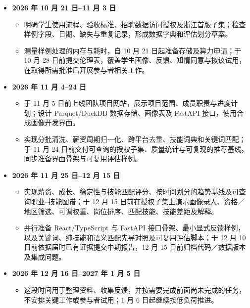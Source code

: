 \documentclass[a4paper,12pt]{article}
\begin{document}
\begin{itemize}
  \item \textbf{2026 年 10 月 21 日--11 月 3 日}
    \begin{itemize}
      \item 明确学生使用流程、验收标准、招聘数据访问授权及浙江首版子集；检查样例字段、日期、缺失与重复记录，形成数据字典和评估划分草案。
      \item 测量样例处理的内存与耗时，自 10 月 21 日起准备存储及算力申请；于 10 月 28 日前提交伦理表，覆盖学生画像、反馈、知情同意与拟议试用，在取得所需批准后开展参与者相关工作。
    \end{itemize}

  \item \textbf{2026 年 11 月 4--24 日}
    \begin{itemize}
      \item 于 11 月 5 日前上线团队项目网站，展示项目范围、成员职责与进度计划；设计 Parquet/DuckDB 数据存储、画像表及 FastAPI 接口，使用合成画像开发界面。
      \item 实现分批清洗、薪资周期归一化、跨平台去重、技能词典和关键词匹配；于 11 月 24 日前交付可查询的授权子集、质量统计与可复现的推荐基线。同步准备界面骨架与可复用评估样例。
    \end{itemize}

  \item \textbf{2026 年 11 月 25 日--12 月 15 日}
    \begin{itemize}
      \item 实现薪资、成长、稳定性与技能匹配评分、按时间划分的趋势基线及可查询职业--技能图谱；于 12 月 15 日前在授权子集上演示画像录入、资格／地区筛选、可调权重、岗位排序、匹配技能、技能差距及解释。
      \item 并行准备 React/TypeScript 与 FastAPI 接口骨架、最小显式反馈样例，以及关键词、纯技能和语义匹配先导对照及可复用评估脚本；于 12 月 10 日前依据届时已有证据提交中期报告，12 月 15 日前归档代码／数据版本及集成问题。
    \end{itemize}

  \item \textbf{2026 年 12 月 16 日--2027 年 1 月 5 日}
    \begin{itemize}
      \item 这段时间用于整理资料、收集反馈，并按需要完成前面尚未完成的任务，不安排关键工作或参与者试用；1 月 6 日起继续按低负荷推进。
    \end{itemize}


\end{itemize}
\end{document}

